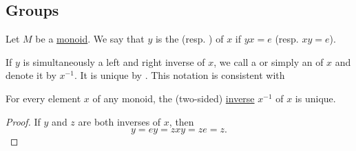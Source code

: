 \subsection{Groups}\label{subsec:groups}

\begin{definition}\label{def:monoid_inverse}
  Let \( M \) be a \hyperref[def:monoid]{monoid}. We say that \( y \) is the  (resp. ) of \( x \) if \( yx = e \) (resp. \( xy = e \)).

  If \( y \) is simultaneously a left and right inverse of \( x \), we call a  or simply an  of \( x \) and denote it by \( x^{-1} \). It is unique by . This notation is consistent with 
\end{definition}

\begin{proposition}\label{def:monoid_inverse_unique}
  For every element \( x \) of any monoid, the (two-sided) \hyperref[def:monoid_inverse]{inverse} \( x^{-1} \) of \( x \) is unique.
\end{proposition}
\begin{proof}
  If \( y \) and \( z \) are both inverses of \( x \), then
  \begin{equation*}
    y = ey = zxy = ze = z.
  \end{equation*}
\end{proof}

